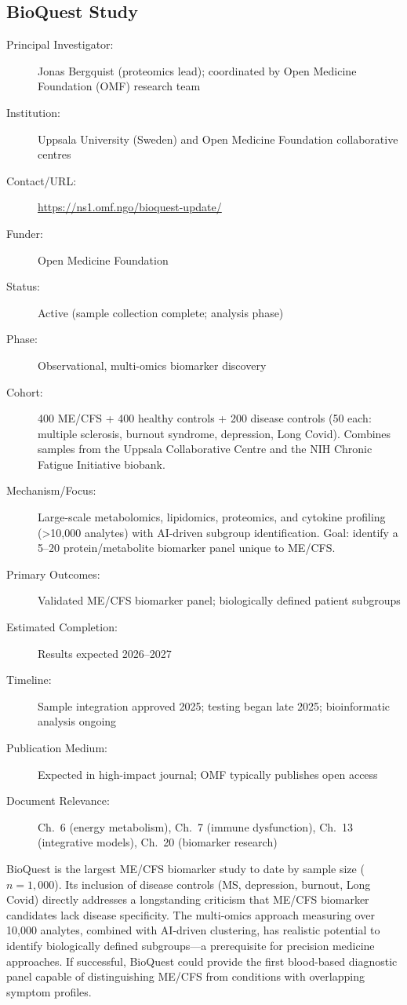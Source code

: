 \subsection{BioQuest Study}
\label{sec:registry-bioquest}

\begin{description}
    \item[Principal Investigator:] Jonas Bergquist (proteomics lead);
        coordinated by Open Medicine Foundation (OMF) research team
    \item[Institution:] Uppsala University (Sweden) and Open Medicine
        Foundation collaborative centres
    \item[Contact/URL:] \url{https://ns1.omf.ngo/bioquest-update/}
    \item[Funder:] Open Medicine Foundation
    \item[Status:] Active (sample collection complete; analysis phase)
    \item[Phase:] Observational, multi-omics biomarker discovery
    \item[Cohort:] 400 ME/CFS + 400 healthy controls + 200 disease controls
        (50 each: multiple sclerosis, burnout syndrome, depression, Long Covid).
        Combines samples from the Uppsala Collaborative Centre and the NIH
        Chronic Fatigue Initiative biobank.
    \item[Mechanism/Focus:] Large-scale metabolomics, lipidomics, proteomics,
        and cytokine profiling (\textgreater10,000 analytes) with AI-driven
        subgroup identification.  Goal: identify a 5--20 protein/metabolite
        biomarker panel unique to ME/CFS.
    \item[Primary Outcomes:] Validated ME/CFS biomarker panel; biologically
        defined patient subgroups
    \item[Estimated Completion:] Results expected 2026--2027
    \item[Timeline:] Sample integration approved 2025; testing began late 2025;
        bioinformatic analysis ongoing
    \item[Publication Medium:] Expected in high-impact journal; OMF typically
        publishes open access
    \item[Document Relevance:] Ch.~6 (energy metabolism), Ch.~7 (immune
        dysfunction), Ch.~13 (integrative models), Ch.~20 (biomarker research)
\end{description}

BioQuest is the largest ME/CFS biomarker study to date by sample size
($n=1{,}000$).  Its inclusion of disease controls (MS, depression, burnout,
Long Covid) directly addresses a longstanding criticism that ME/CFS biomarker
candidates lack disease specificity.  The multi-omics approach measuring over
10,000 analytes, combined with AI-driven clustering, has realistic potential to
identify biologically defined subgroups---a prerequisite for precision
medicine approaches.  If successful, BioQuest could provide the first
blood-based diagnostic panel capable of distinguishing ME/CFS from conditions
with overlapping symptom profiles.

